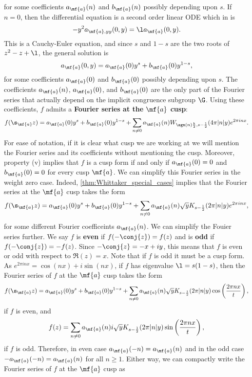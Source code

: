     for some coefficients $a_{\mf{a}}(n)$ and $b_{\mf{a}}(n)$ possibly depending upon $s$. If $n = 0$, then the differential equation is a second order linear ODE which in is
    \[
      -y^{2}a_{\mf{a},yy}(0,y) = \l a_{\mf{a}}(0,y).
    \]
    This is a Cauchy-Euler equation, and since $s$ and $1-s$ are the two roots of $z^{2}-z+\l$, the general solution is
    \[
      a_{\mf{a}}(0,y) = a_{\mf{a}}(0)y^{s}+b_{\mf{a}}(0)y^{1-s},
    \]
    for some coefficients $a_{\mf{a}}(0)$ and $b_{\mf{a}}(0)$ possibly depending upon $s$. The coefficients $a_{\mf{a}}(n)$, $a_{\mf{a}}(0)$, and $b_{\mf{a}}(0)$ are the only part of the Fourier series that actually depend on the implicit congruence subgroup $\G$. Using these coefficients, $f$ admits a \textbf{Fourier series at the $\mf{a}$ cusp}:
    \[
      f(\s_{\mf{a}}z) = a_{\mf{a}}(0)y^{s}+b_{\mf{a}}(0)y^{1-s}+\sum_{n \neq 0}a_{\mf{a}}(n)W_{\sgn(n)\frac{k}{2},s-\frac{1}{2}}(4\pi|n|y)e^{2\pi inx}.
    \]
    For ease of notation, if it is clear what cusp we are working at we will mention the Fourier series and its coefficients without mentioning the cusp. Moreover, property (v) implies that $f$ is a cusp form if and only if $a_{\mf{a}}(0) = 0$ and $b_{\mf{a}}(0) = 0$ for every cusp $\mf{a}$. We can simplify this Fourier series in the weight zero case. Indeed, \cref{thm:Whittaker_special_cases} implies that the Fourier series at the $\mf{a}$ cusp takes the form
    \[
      f(\s_{\mf{a}}z) = a_{\mf{a}}(0)y^{s}+b_{\mf{a}}(0)y^{1-s}+\sum_{n \neq 0}a_{\mf{a}}(n)\sqrt{y}K_{s-\frac{1}{2}}(2\pi|n|y)e^{2\pi inx},
    \]
    for some different Fourier coefficeints $a_{\mf{a}}(n)$. We can simplify the Fouier series further. We say $f$ is \textbf{even} if $f(-\conj{z}) = f(z)$ and is \textbf{odd} if $f(-\conj{z}) = -f(z)$. Since $-\conj{z} = -x+iy$, this means that $f$ is even or odd with respect to $\Re(z) = x$. Note that if $f$ is odd it must be a cusp form. As $e^{2\pi inx} = \cos(nx)+i\sin(nx)$, if $f$ has eigenvalue $\l = s(1-s)$, then the Fourier series of $f$ at the $\mf{a}$ cusp takes the form 
    \[
      f(\s_{\mf{a}}z) = a_{\mf{a}}(0)y^{s}+b_{\mf{a}}(0)y^{1-s}+\sum_{n \neq 0}a_{\mf{a}}(n)\sqrt{y}K_{s-\frac{1}{2}}(2\pi|n|y)\cos\left(\frac{2\pi nx}{t}\right),
    \]
    if $f$ is even, and
    \[
      f(z) = \sum_{n \neq 0}a_{\mf{a}}(n)i\sqrt{y}K_{s-\frac{1}{2}}(2\pi|n|y)\sin\left(\frac{2\pi nx}{t}\right),
    \]
    if $f$ is odd. Therefore, in even case $a_{\mf{a}}(-n) = a_{\mf{a}}(n)$ and in the odd case $-a_{\mf{a}}(-n) = a_{\mf{a}}(n)$ for all $n \ge 1$. Either way, we can compactly write the Fourier series of $f$ at the $\mf{a}$ cusp as
